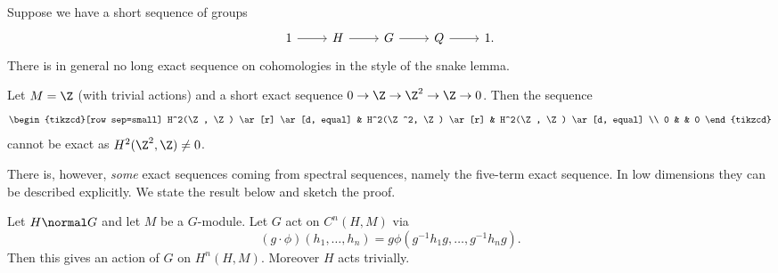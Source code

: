 \documentclass[a4paper]{article}
\begin{document}
Suppose we have a short sequence of groups
\[
  \begin{tikzcd}
    1 \ar[r] & H \ar[r] & G \ar[r] & Q \ar[r] & 1.
  \end{tikzcd}
\]
There is in general no long exact sequence on cohomologies in the style of the snake lemma.

\begin{eg}
  Let \(M = \Z\) (with trivial actions) and a short exact sequence \(0 \to \Z \to \Z^2 \to \Z \to 0\). Then the sequence
  \[
    \begin{tikzcd}[row sep=small]
      H^2(\Z, \Z) \ar[r] \ar[d, equal] & H^2(\Z^2, \Z) \ar[r] & H^2(\Z, \Z) \ar[d, equal] \\
      0 & & 0
    \end{tikzcd}
  \]
  cannot be exact as \(H^2(\Z^2, \Z) \ne 0\).
\end{eg}

There is, however, \emph{some} exact sequences coming from spectral sequences, namely the five-term exact sequence. In low dimensions they can be described explicitly. We state the result below and sketch the proof.

\begin{lemma}
  Let \(H \normal G\) and let \(M\) be a \(G\)-module. Let \(G\) act on \(C^n(H, M)\) via
  \[
    (g \cdot \phi)(h_1, \dots, h_n) = g\phi(g^{-1} h_1g, \dots, g^{-1}h_n g).
  \]
  Then this gives an action of \(G\) on \(H^n(H, M)\). Moreover \(H\) acts trivially.
\end{lemma}
\end{document}
